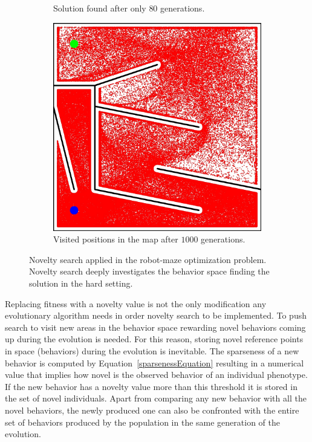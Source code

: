 \begin{figure}[t!]
\begin{subfigure}[b]{0.3\textwidth}
\caption{Solution found after only $80$ generations.}
\label{fig:mazeNoveltyHardSolution}
\end{subfigure}\hspace{0.3cm}
\begin{subfigure}[b]{0.3\textwidth}
\includegraphics[width=1.0\textwidth]{../Figures/Misc/MazeHardNovelty.jpg}
\caption{ Visited positions in the map after $1000$ generations.}
\label{fig:mazeNoveltyHard}
\end{subfigure}
\caption{Novelty search applied in the robot-maze optimization problem. Novelty search deeply investigates the behavior space finding the solution in the hard setting.}
\label{fig:mazeNovelty}
\end{figure}


Replacing fitness with a novelty value is not the only modification any evolutionary algorithm needs in order novelty search to be implemented. To push search to visit new areas in the behavior space rewarding novel behaviors coming up during the evolution is needed. For this reason, storing novel reference points in space (behaviors) during the evolution is inevitable. The sparseness of a new behavior is computed by Equation~\ref{sparsenessEquation} resulting in a numerical value that implies how novel is the observed behavior of an individual phenotype. If the new behavior has a novelty value more than this threshold it is stored in the set of novel individuals. Apart from comparing any new behavior with all the novel behaviors, the newly produced one can also be confronted with the entire set of behaviors produced by the population in the same generation of the evolution. 

